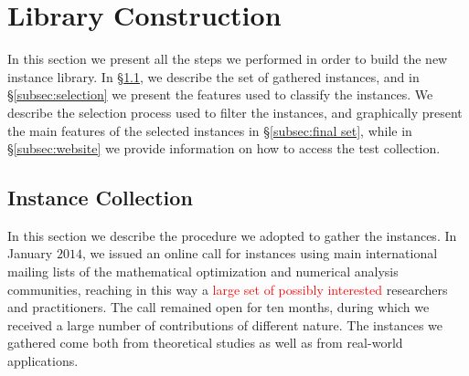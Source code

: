 \section{Library Construction}\label{sec:lib}

In this section we present all the steps we performed in order to build
the new instance library. In \S\ref{subsec:instColl}, we describe the set
of gathered instances, and
in \S\ref{subsec:selection} we present the features used to
classify the instances.
We describe the selection process used to filter the instances, and
graphically present the main features of the selected instances in
\S\ref{subsec:final set}, while in \S\ref{subsec:website}
we provide information on how to access the test collection.

\subsection{Instance Collection}\label{subsec:instColl}

In this section we describe the procedure we adopted to gather the
instances. In January $2014$, we issued an online call for instances
using main international mailing lists of the mathematical
optimization and numerical analysis communities, reaching in this way
a \textcolor{red}{large set of possibly interested} researchers and practitioners.
The call remained open for ten months, during which we received a large
number of contributions of different nature. The instances we gathered
come both from theoretical studies as well as from real-world
applications.


